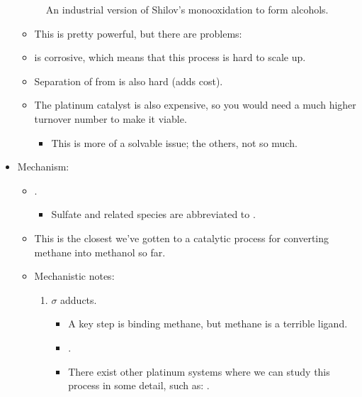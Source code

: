 \documentclass[../notes.tex]{subfiles}
\begin{document}
\begin{itemize}
\begin{figure}[h!]
        \schemestop
        \caption{An industrial version of Shilov's monooxidation to form alcohols.}
        \label{fig:ShilovAlcoholFormation}
    \end{figure}
    \begin{itemize}
        \item This is pretty powerful, but there are problems:
        \item {} is corrosive, which means that this process is hard to scale up.
        \item Separation of  from  is also hard (adds cost).
        \item The platinum catalyst is also expensive, so you would need a much higher turnover number to make it viable.
        \begin{itemize}
            \item This is more of a solvable issue; the others, not so much.
        \end{itemize}
    \end{itemize}
    \item Mechanism:
    \begin{itemize}
        \item {}.
        \begin{itemize}
            \item Sulfate and related species are abbreviated to .
        \end{itemize}
        \item This is the closest we've gotten to a catalytic process for converting methane into methanol so far.
        \item Mechanistic notes:
        \begin{enumerate}
            \item $\sigma$ adducts.
            \begin{itemize}
                \item A key step is binding methane, but methane is a terrible ligand.
                \item {}.
                \item There exist other platinum systems where we can study this process in some detail, such as: .
                \begin{itemize}

\end{itemize}
\end{itemize}
\end{enumerate}
\end{itemize}
\end{itemize}
\end{document}
